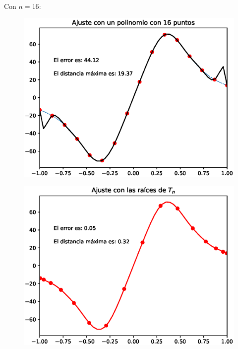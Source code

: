 \newpage

Con $n = 16$:
\\
\begin{minipage}{0.45\linewidth}
    \begin{figure}[H]
    \centering
    \includegraphics[scale=0.44]{Imagenes/Interpolacion_Chebychev_16_Polinomio.eps}
    \end{figure}       
\end{minipage}
\hspace{0.1cm}
\begin{minipage}{0.45\linewidth}
\begin{figure}[H]
    \centering
    \includegraphics[scale=0.44]{Imagenes/Interpolacion_Chebychev_16_Raices.eps}
\end{figure}
\end{minipage}
